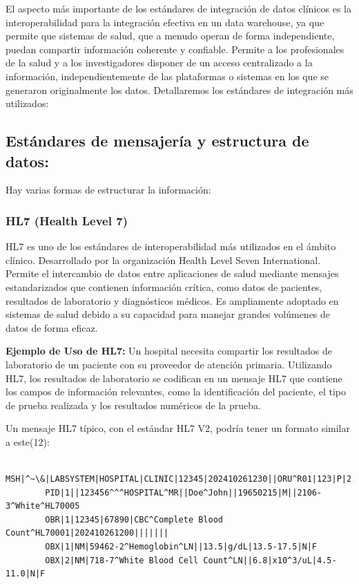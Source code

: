 \documentclass[12pt, a4paper, twoside]{article}
\begin{document}
	
	El aspecto más importante de los estándares de integración de datos clínicos es la interoperabilidad para la integración efectiva en un data warehouse, ya que permite que sistemas de salud, que a menudo operan de forma independiente, puedan compartir información coherente y confiable. 
	Permite a los profesionales de la salud y a los investigadores disponer de un acceso centralizado a la información, independientemente de las plataformas o sistemas en los que se generaron originalmente los datos.
	Detallaremos los estándares de integración más utilizados:
	
	
	\subsection{Estándares de mensajería y estructura de datos:}
	
	Hay varias formas de estructurar la información:
	
	\subsubsection{HL7 (Health Level 7)} 
	HL7 es uno de los estándares de interoperabilidad más utilizados en el ámbito clínico. Desarrollado por la organización Health Level Seven International. Permite el intercambio de datos entre aplicaciones de salud mediante mensajes estandarizados que contienen información crítica, como datos de pacientes, resultados de laboratorio y diagnósticos médicos. Es ampliamente adoptado en sistemas de salud debido a su capacidad para manejar grandes volúmenes de datos de forma eficaz. 
	
	\textbf{Ejemplo de Uso de HL7:} Un hospital necesita compartir los resultados de laboratorio de un paciente con su proveedor de atención primaria. Utilizando HL7, los resultados de laboratorio se codifican en un mensaje HL7 que contiene los campos de información relevantes, como la identificación del paciente, el tipo de prueba realizada y los resultados numéricos de la prueba.
	
	Un mensaje HL7 típico, con el estándar HL7 V2, podría tener un formato similar a este(12):
	
	\begin{verbatim}
		MSH|^~\&|LABSYSTEM|HOSPITAL|CLINIC|12345|202410261230||ORU^R01|123|P|2.3
		PID|1||123456^^^HOSPITAL^MR||Doe^John||19650215|M||2106-3^White^HL70005
		OBR|1|12345|67890|CBC^Complete Blood Count^HL70001|202410261200|||||||
		OBX|1|NM|59462-2^Hemoglobin^LN||13.5|g/dL|13.5-17.5|N|F
		OBX|2|NM|718-7^White Blood Cell Count^LN||6.8|x10^3/uL|4.5-11.0|N|F
	\end{verbatim}
	
\end{document}
